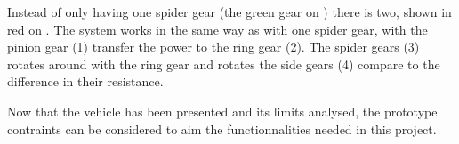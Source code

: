 








Instead of only having one spider gear (the green gear on ) there is two, shown in red on . The system works in the same way as with one spider gear, with the pinion gear (1) transfer the power to the ring gear (2). The spider gears (3) rotates around with the ring gear and rotates the side gears (4) compare to the difference in their resistance.

Now that the vehicle has been presented and its limits analysed, the prototype contraints can be considered to aim the functionnalities needed in this project.

